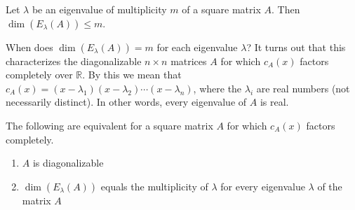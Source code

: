 \documentclass[12pt]{article}
\begin{document}
\begin{lemma}{}{}
    Let $ \lambda $ be an eigenvalue of multiplicity $ m $ of a square matrix $ A $. Then $ \dim \left( E_\lambda \left( A \right) \right) \leq m $.
\end{lemma}

\begin{note}{}{}
    When does $ \dim \left( E_\lambda \left( A \right) \right) = m $ for each eigenvalue $ \lambda $? It turns out that this characterizes the diagonalizable $ n \times n $ matrices $ A $ for which $ c_A \left( x \right) $ factors completely over $ \mathbb{R} $. By this we mean that $ c_A \left( x \right) = \left( x - \lambda_1 \right) \left( x - \lambda_2 \right) \cdots \left( x - \lambda_n \right) $, where the $ \lambda_i $ are real numbers (not necessarily distinct). In other words, every eigenvalue of $ A $ is real.
\end{note}

\begin{theorem}{}{}
    The following are equivalent for a square matrix $ A $ for which $ c_A \left( x \right) $ factors completely.
    \begin{enumerate}
        \item $ A $ is diagonalizable
        \item $ \dim \left( E_\lambda \left( A \right) \right) $ equals the multiplicity of $ \lambda $ for every eigenvalue $ \lambda $ of the matrix $ A $
    \end{enumerate}
\end{theorem}
\end{document}
